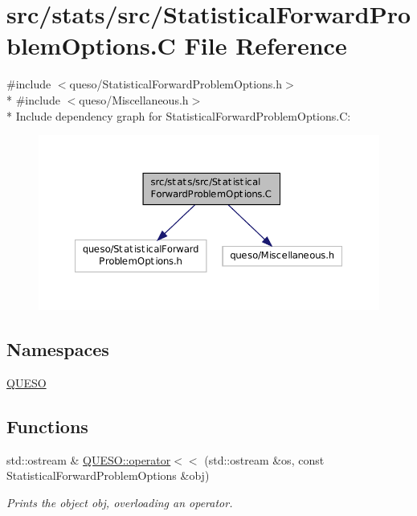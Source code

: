 \hypertarget{_statistical_forward_problem_options_8_c}{\section{src/stats/src/\-Statistical\-Forward\-Problem\-Options.C File Reference}
\label{_statistical_forward_problem_options_8_c}
}
{\ttfamily \#include $<$queso/\-Statistical\-Forward\-Problem\-Options.\-h$>$}\\*
{\ttfamily \#include $<$queso/\-Miscellaneous.\-h$>$}\\*
Include dependency graph for Statistical\-Forward\-Problem\-Options.\-C\-:
\nopagebreak
\begin{figure}[H]
\begin{center}
\leavevmode
\includegraphics[width=350pt]{_statistical_forward_problem_options_8_c__incl}
\end{center}
\end{figure}
\subsection*{Namespaces}
\begin{DoxyCompactItemize}
\item 
\hyperlink{namespace_q_u_e_s_o}{Q\-U\-E\-S\-O}
\end{DoxyCompactItemize}
\subsection*{Functions}
\begin{DoxyCompactItemize}
\item 
std\-::ostream \& \hyperlink{namespace_q_u_e_s_o_a185311186813492aebbb75fdf9943611}{Q\-U\-E\-S\-O\-::operator$<$$<$} (std\-::ostream \&os, const Statistical\-Forward\-Problem\-Options \&obj)
\begin{DoxyCompactList}\small\item\em Prints the object {\ttfamily obj}, overloading an operator. \end{DoxyCompactList}\end{DoxyCompactItemize}
